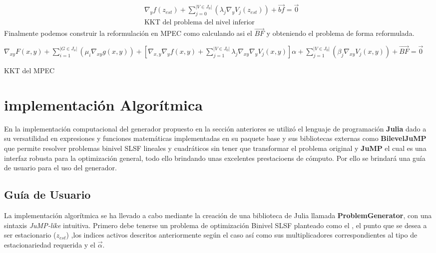 \begin{equation}
    \begin{aligned}
        &\nabla_{y}f(z_{est})+\sum_{j=0}^{|V \in J_0|}(\lambda_j\nabla_{y}V_j(z_{est}))+\vec{bf}=\vec{0}\\
        &\text{KKT del problema del nivel inferior}
    \end{aligned}
    \label{KKT_nivel_inferior}
\end{equation}
\linebreak
Finalmente podemos construir la reformulación en MPEC como  calculando asi el $\vec{BF}$ y 
obteniendo el problema de forma reformulada.
\begin{table}[H]
    \begin{equation}
        \label{KKT_del_MPEC}
    \end{equation}
	$\nabla_{xy}F(x,y)+\sum_{i=1}^{|G \in J_o|}(\mu_i\nabla_{xy}g(x,y))+[\nabla_{x,y}\nabla_{y}f(x,y)+\sum_{j=1}^{|V \in J_0|}\lambda_j\nabla_{xy}\nabla_{y}V_j(x,y)]\alpha+\sum_{j=1}^{|V \in J_0|}(\beta_j\nabla_{xy}V_j(x,y))+\vec{BF}=\vec{0}$  \label{KKT_del_MPEC}
\caption*{KKT del MPEC}
\end{table}


\section{implementación Algorítmica}

En la implementación computacional del generador propuesto en la sección anteriores
se utilizó el lenguaje de programación \textbf{Julia} \cite{Juliadocs} dado a su versatilidad
en expresiones y funciones matemáticas implementadas en su paquete base y sus bibliotecas externas como 
\textbf{BilevelJuMP} \cite{BilevelJump} que permite resolver problemas binivel SLSF lineales y cuadráticos
sin tener que transformar el problema original y \textbf{JuMP} \cite{JuMPPaper} el cual es una interfaz robusta para la optimización general,
todo ello brindando unas excelentes prestacioens de cómputo. Por ello se brindará una guía de usuario para el uso del generador.

\subsection{Guía de Usuario}
La implementación algorítmica se ha llevado a cabo mediante la creación de una biblioteca de Julia
llamada \textbf{ProblemGenerator}, con una sintaxis \textit{JuMP-like} intuitiva.
Primero debe tenerse un problema de optimización Binivel SLSF planteado como el , el punto que se desea a ser estacionario ($z_{est}$) ,los indices activos descritos anteriormente 
según el caso así como sus multiplicadores correspondientes al tipo de estacionariedad requerida y el $\vec{\alpha}$.

